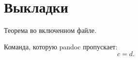 \section{Выкладки}

\begin{theorem}\label{thm:calc}
Теорема во включенном файле.
\end{theorem}

Команда, которую pandoc пропускает: \enlargethispage{1cm}
\begin{equation}\label{eq:calc}
  c = d.
\end{equation}
